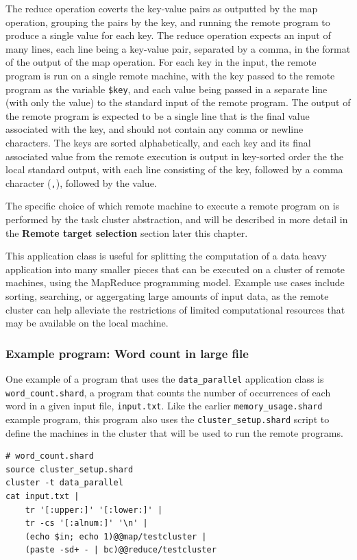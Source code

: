 \documentclass[twoside]{report}
\begin{document}
The reduce operation coverts the key-value pairs as outputted by the map operation, grouping the pairs by the key, and running the remote program to produce a single value for each key.
The reduce operation expects an input of many lines, each line being a key-value pair, separated by a comma, in the format of the output of the map operation.
For each key in the input, the remote program is run on a single remote machine, with the key passed to the remote program as the variable \texttt{\$key}, and each value being passed in a separate line (with only the value) to the standard input of the remote program.
The output of the remote program is expected to be a single line that is the final value associated with the key, and should not contain any comma or newline characters.
The keys are sorted alphabetically, and each key and its final associated value from the remote execution is output in key-sorted order the the local standard output, with each line consisting of the key, followed by a comma character (\texttt{,}), followed by the value.

The specific choice of which remote machine to execute a remote program on is performed by the task cluster abstraction, and will be described in more detail in the \textbf{Remote target selection} section later this chapter.

This application class is useful for splitting the computation of a data heavy application into many smaller pieces that can be executed on a cluster of remote machines, using the MapReduce programming model.
Example use cases include sorting, searching, or aggergating large amounts of input data, as the remote cluster can help alleviate the restrictions of limited computational resources that may be available on the local machine.

\subsubsection{Example program: Word count in large file}

One example of a program that uses the \texttt{data\_parallel} application class is \texttt{word\_count.shard}, a program that counts the number of occurrences of each word in a given input file, \texttt{input.txt}.
Like the earlier \texttt{memory\_usage.shard} example program, this program also uses the \texttt{cluster\_setup.shard} script to define the machines in the cluster that will be used to run the remote programs.

\begin{lstlisting}[language=Shard]
# word_count.shard
source cluster_setup.shard
cluster -t data_parallel
cat input.txt |
    tr '[:upper:]' '[:lower:]' |
    tr -cs '[:alnum:]' '\n' |
    (echo $in; echo 1)@@map/testcluster |
    (paste -sd+ - | bc)@@reduce/testcluster
\end{lstlisting}
\end{document}
